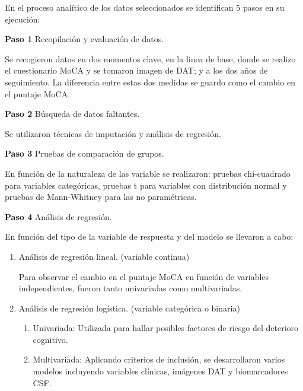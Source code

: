 	En el proceso analítico de los datos seleccionados se identifican 5 pasos en su ejecución:
	
	\begin{description}
		
		\item {\textbf{Paso 1}} Recopilación y evaluación de datos.
		
		Se recogieron datos en dos momentos clave, en la linea de base, donde se realizo el cuestionario MoCA y se tomaron imagen de DAT; y a los dos años de seguimiento. La diferencia entre estas dos medidas se guardo como el cambio en el puntaje MoCA.
		
		\item {\textbf{Paso 2}} Búsqueda de datos faltantes.
		
		Se utilizaron técnicas de imputación y análisis de regresión.
		
		\item{\textbf{Paso 3}} Pruebas de comparación de grupos.
		
		En función de la naturaleza de las variable se realizaron: pruebas chi-cuadrado	para variables categóricas, pruebas t para variables con distribución normal y pruebas de Mann-Whitney para las no paramétricas.
		
		
		\item {\textbf{Paso 4}} Análisis de regresión.
		
		En función del tipo de la variable de respuesta y del modelo se llevaron a cabo:
		
		\begin {enumerate}
		\item Análisis de regresión lineal. (variable continua)
		
		Para observar el cambio en el puntaje MoCA en función de variables independientes, fueron tanto univariadas como multivariadas. 
		
		\item Análisis de regresión logística. (variable categórica o binaria)
		
		\begin{enumerate}
			\item Univariada: Utilizada para hallar posibles factores de riesgo del deterioro cognitivo.
			\item Multivariada: Aplicando criterios de inclusión, se desarrollaron varios modelos incluyendo variables clínicas, imágenes DAT y biomarcadores CSF.
			\end {enumerate}			
			\end {enumerate}
			

\end{description}
